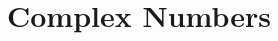 \documentclass[../master.tex]{subfiles}
\begin{document}
\chapter{Complex Numbers}

% 
\end{document}
